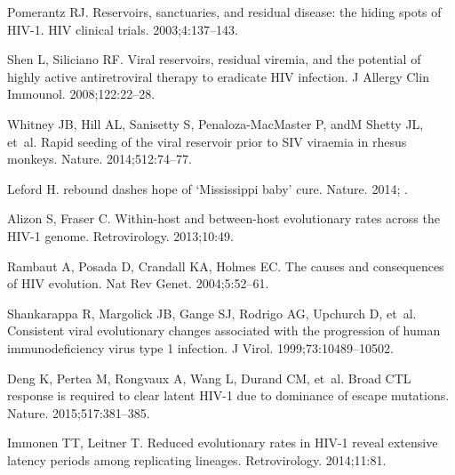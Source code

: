 \documentclass{bmcart}
\begin{document}
\begin{backmatter}
\begin{thebibliography}{10}
Pomerantz RJ.
\newblock Reservoirs, sanctuaries, and residual disease: the hiding spots of
  {HIV-1}.
\newblock HIV clinical trials. 2003;\hspace{0pt}4:137--143.

Shen L, Siliciano RF.
\newblock Viral reservoirs, residual viremia, and the potential of highly
  active antiretroviral therapy to eradicate {HIV} infection.
\newblock J Allergy Clin Immounol. 2008;\hspace{0pt}122:22--28.

Whitney JB, Hill AL, Sanisetty S, Penaloza-MacMaster P, andM Shetty JL, et~al.
\newblock Rapid seeding of the viral reservoir prior to {SIV} viraemia in
  rhesus monkeys.
\newblock Nature. 2014;\hspace{0pt}512:74--77.

Leford H.
 rebound dashes hope of {`Mississippi baby'} cure.
\newblock Nature. 2014;\hspace{0pt} .

Alizon S, Fraser C.
\newblock Within-host and between-host evolutionary rates across the {HIV-1}
  genome.
\newblock Retrovirology. 2013;\hspace{0pt}10:49.

Rambaut A, Posada D, Crandall KA, Holmes EC.
\newblock The causes and consequences of {HIV} evolution.
\newblock Nat Rev Genet. 2004;\hspace{0pt}5:52--61.

Shankarappa R, Margolick JB, Gange SJ, Rodrigo AG, Upchurch D, et~al.
\newblock Consistent viral evolutionary changes associated with the progression
  of human immunodeficiency virus type 1 infection.
\newblock J Virol. 1999;\hspace{0pt}73:10489--10502.

Deng K, Pertea M, Rongvaux A, Wang L, Durand CM, et~al.
\newblock Broad {CTL} response is required to clear latent {HIV-1} due to
  dominance of escape mutations.
\newblock Nature. 2015;\hspace{0pt}517:381--385.

Immonen TT, Leitner T.
\newblock Reduced evolutionary rates in {HIV-1} reveal extensive latency
  periods among replicating lineages.
\newblock Retrovirology. 2014;\hspace{0pt}11:81.


\end{thebibliography}
\end{backmatter}
\end{document}

